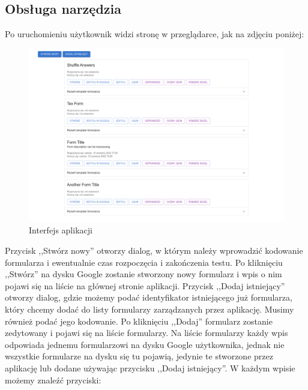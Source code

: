 \subsection{Obsługa narzędzia}
Po uruchomieniu użytkownik widzi stronę w przeglądarce, jak na zdjęciu poniżej:
\begin{figure}[H]
 \centering
  \includegraphics[scale=0.30]{strona.png}
  \caption{Interfejs aplikacji}
  \label{fig:1}
\end{figure}
Przycisk ,,Stwórz nowy'' otworzy dialog, w którym należy wprowadzić kodowanie 
formularza i ewentualnie czas rozpoczęcia i zakończenia testu. Po kliknięciu 
,,Stwórz'' na dysku Google zostanie stworzony nowy formularz i wpis o nim pojawi
się na liście na głównej stronie aplikacji. Przycisk ,,Dodaj istniejący'' otworzy
dialog, gdzie możemy podać identyfikator istniejącego już formularza, który chcemy
dodać do listy formularzy zarządzanych przez aplikację. Musimy również podać jego
kodowanie. Po kliknięciu ,,Dodaj'' formularz zostanie zedytowany i pojawi się na 
liście formularzy. Na liście formularzy każdy wpis odpowiada jednemu formularzowi
na dysku Google użytkownika, jednak nie wszystkie formularze na dysku się tu pojawią,
jedynie te stworzone przez aplikację lub dodane używając przycisku ,,Dodaj istniejący''.
W każdym wpisie możemy znaleźć przyciski:
